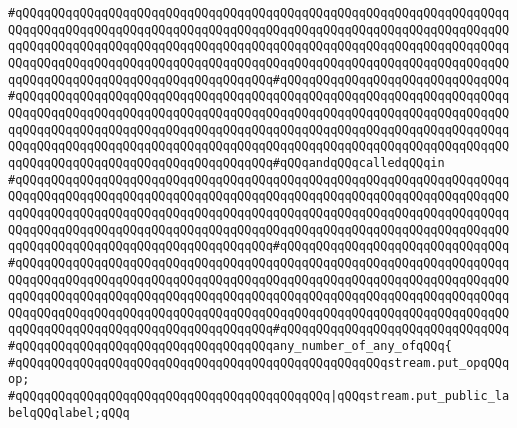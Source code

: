 \verb|#qQQqqQQqqQQqqQQqqQQqqQQqqQQqqQQqqQQqqQQqqQQqqQQqqQQqqQQqqQQqqQQqqQQqqQQqqQQqqQQqqQQqqQQqqQQqqQQqqQQqqQQqqQQqqQQqqQQqqQQqqQQqqQQqqQQqqQQqqQQqqQQqqQQqqQQqqQQqqQQqqQQqqQQqqQQqqQQqqQQqqQQqqQQqqQQqqQQqqQQqqQQqqQQqqQQqqQQqqQQqqQQqqQQqqQQqqQQqqQQqqQQqqQQqqQQqqQQqqQQqqQQqqQQqqQQqqQQqqQQqqQQqqQQqqQQqqQQqqQQqqQQqqQQqqQQqqQQq#qQQqqQQqqQQqqQQqqQQqqQQqqQQqqQQq|\newline
\verb|#qQQqqQQqqQQqqQQqqQQqqQQqqQQqqQQqqQQqqQQqqQQqqQQqqQQqqQQqqQQqqQQqqQQqqQQqqQQqqQQqqQQqqQQqqQQqqQQqqQQqqQQqqQQqqQQqqQQqqQQqqQQqqQQqqQQqqQQqqQQqqQQqqQQqqQQqqQQqqQQqqQQqqQQqqQQqqQQqqQQqqQQqqQQqqQQqqQQqqQQqqQQqqQQqqQQqqQQqqQQqqQQqqQQqqQQqqQQqqQQqqQQqqQQqqQQqqQQqqQQqqQQqqQQqqQQqqQQqqQQqqQQqqQQqqQQqqQQqqQQqqQQqqQQqqQQqqQQq#qQQqandqQQqcalledqQQqin|\newline
\verb|#qQQqqQQqqQQqqQQqqQQqqQQqqQQqqQQqqQQqqQQqqQQqqQQqqQQqqQQqqQQqqQQqqQQqqQQqqQQqqQQqqQQqqQQqqQQqqQQqqQQqqQQqqQQqqQQqqQQqqQQqqQQqqQQqqQQqqQQqqQQqqQQqqQQqqQQqqQQqqQQqqQQqqQQqqQQqqQQqqQQqqQQqqQQqqQQqqQQqqQQqqQQqqQQqqQQqqQQqqQQqqQQqqQQqqQQqqQQqqQQqqQQqqQQqqQQqqQQqqQQqqQQqqQQqqQQqqQQqqQQqqQQqqQQqqQQqqQQqqQQqqQQqqQQqqQQqqQQq#qQQqqQQqqQQqqQQqqQQqqQQqqQQqqQQq|\newline
\verb|#qQQqqQQqqQQqqQQqqQQqqQQqqQQqqQQqqQQqqQQqqQQqqQQqqQQqqQQqqQQqqQQqqQQqqQQqqQQqqQQqqQQqqQQqqQQqqQQqqQQqqQQqqQQqqQQqqQQqqQQqqQQqqQQqqQQqqQQqqQQqqQQqqQQqqQQqqQQqqQQqqQQqqQQqqQQqqQQqqQQqqQQqqQQqqQQqqQQqqQQqqQQqqQQqqQQqqQQqqQQqqQQqqQQqqQQqqQQqqQQqqQQqqQQqqQQqqQQqqQQqqQQqqQQqqQQqqQQqqQQqqQQqqQQqqQQqqQQqqQQqqQQqqQQqqQQqqQQq#qQQqqQQqqQQqqQQqqQQqqQQqqQQqqQQq|\newline
\verb|#qQQqqQQqqQQqqQQqqQQqqQQqqQQqqQQqqQQqany_number_of_any_ofqQQq{|\newline
\verb|#qQQqqQQqqQQqqQQqqQQqqQQqqQQqqQQqqQQqqQQqqQQqqQQqqQQqstream.put_opqQQqop;|\newline
\verb|#qQQqqQQqqQQqqQQqqQQqqQQqqQQqqQQqqQQqqQQqqQQq|\verb#|qQQqstream.put_public_labelqQQqlabel;qQQq#\newline
